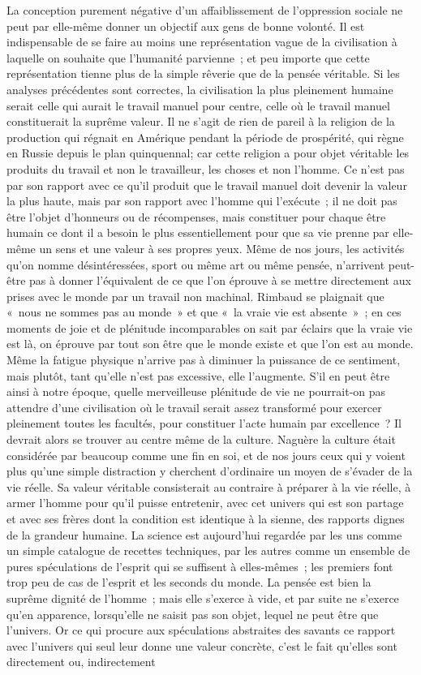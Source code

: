 \documentclass[french,twoside]{book} %
\begin{document}
La conception purement négative d'un affaiblissement de l'oppression sociale ne peut par elle-même donner un objectif aux gens de bonne volonté. Il est indispensable de se faire au moins une représentation vague de la civilisation à laquelle on souhaite que l'humanité parvienne ; et peu importe que cette représentation tienne plus de la simple rêverie que de la pensée véritable. Si les analyses précédentes sont correctes, la civilisation la plus pleinement humaine serait celle qui aurait le travail manuel pour centre, celle où le travail manuel constituerait la suprême valeur. Il ne s'agit de rien de pareil à la religion de la production qui régnait en Amérique pendant la période de prospérité, qui règne en Russie depuis le plan quinquennal; car cette religion a pour objet véritable les produits du travail et non le travailleur, les choses et non l'homme. Ce n'est pas par son rapport avec ce qu'il produit que le travail manuel doit devenir la valeur la plus haute, mais par son rapport avec l'homme qui l'exécute ; il ne doit pas être l'objet d'honneurs ou de récompenses, mais constituer pour chaque être humain ce dont il a besoin le plus essentiellement pour que sa vie prenne par elle-même un sens et une valeur à ses propres yeux. Même de nos jours, les activités qu'on nomme désintéressées, sport ou même art ou même pensée, n'arrivent peut-être pas à donner l’équivalent de ce que l'on éprouve à se mettre directement aux prises avec le monde par un travail non machinal. Rimbaud se plaignait que « nous ne sommes pas au monde » et que « la vraie vie est absente » ; en ces moments de joie et de plénitude incomparables on sait par éclairs que la vraie vie est là, on éprouve par tout son être que le monde existe et que l'on est au monde. Même la fatigue physique n'arrive pas à diminuer la puissance de ce sentiment, mais plutôt, tant qu'elle n'est pas excessive, elle l'augmente. S'il en peut être ainsi à notre époque, quelle merveilleuse plénitude de vie ne pourrait-on pas attendre d'une civilisation où le travail serait assez transformé pour exercer pleinement toutes les facultés, pour constituer l'acte humain par excellence ? Il devrait alors se trouver au centre même de la culture. Naguère la culture était considérée par beaucoup comme une fin en soi, et de nos jours ceux qui y voient plus qu'une simple distraction y cherchent d'ordinaire un moyen de s'évader de la vie réelle. Sa valeur véritable consisterait au contraire à préparer à la vie réelle, à armer l'homme pour qu'il puisse entretenir, avec cet univers qui est son partage et avec ses frères dont la condition est identique à la sienne, des rapports dignes de la grandeur humaine. La science est aujourd'hui regardée par les uns comme un simple catalogue de recettes techniques, par les autres comme un ensemble de pures spéculations de l'esprit qui se suffisent à elles-mêmes ; les premiers font trop peu de cas de l'esprit et les seconds du monde. La pensée est bien la suprême dignité de l'homme ; mais elle s'exerce à vide, et par suite ne s'exerce qu'en apparence, lorsqu'elle ne saisit pas son objet, lequel ne peut être que l'univers. Or ce qui procure aux spéculations abstraites des savants ce rapport avec l'univers qui seul leur donne une valeur concrète, c'est le fait qu'elles sont directement ou, indirectement 
\end{document}
